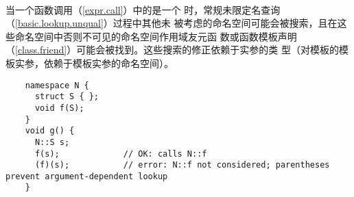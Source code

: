 \paragraph{} %
当一个函数调用（\ref{expr.call}）中的是一个
时，常规未限定名查询（\ref{basic.lookup.unqual}）过程中其他未
被考虑的命名空间可能会被搜索，且在这些命名空间中否则不可见的命名空间作用域友元函
数或函数模板声明（\ref{class.friend}）可能会被找到。这些搜索的修正依赖于实参的类
型（对模板的模板实参，依赖于模板实参的命名空间）。

\begin{example}
  \begin{lstlisting}
    namespace N {
      struct S { };
      void f(S);
    }
    void g() {
      N::S s;
      f(s);             // OK: calls N::f
      (f)(s);           // error: N::f not considered; parentheses prevent argument-dependent lookup
    }
  \end{lstlisting}
\end{example}

